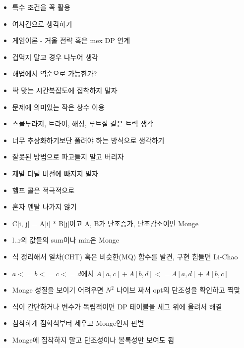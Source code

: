 \documentclass[landscape, 10pt, a4paper, oneside, twocolumn]{extarticle}
\begin{document}
\begin{itemize}
    \item 특수 조건을 꼭 활용
    \item 여사건으로 생각하기
    \item 게임이론 - 거울 전략 혹은 mex DP 연계
    \item 겁먹지 말고 경우 나누어 생각
    \item 해법에서 역순으로 가능한가?
    \item 딱 맞는 시간복잡도에 집착하지 말자
    \item 문제에 의미있는 작은 상수 이용
    \item 스몰투라지, 트라이, 해싱, 루트질 같은 트릭 생각
    \item 너무 추상화하기보단 풀려야 하는 방식으로 생각하기
    \item 잘못된 방법으로 파고들지 말고 버리자
    \item 제발 터널 비전에 빠지지 말자
    \item 헬프 콜은 적극적으로
    \item 혼자 멘탈 나가지 않기
\end{itemize}

\begin{itemize}
    \item C[i, j] = A[i] * B[j]이고 A, B가 단조증가, 단조감소이면 Monge
    \item l..r의 값들의 sum이나 min은 Monge

    \item 식 정리해서 일차(CHT) 혹은 비슷한(MQ) 함수를 발견, 구현 힘들면 Li-Chao
    \item $a <= b <= c <= d$에서 $A[a,c] + A[b,d] <= A[a,d] + A[b,c]$
    \item Monge 성질을 보이기 어려우면 $N^2$ 나이브 짜서 opt의 단조성을 확인하고 찍맞
    \item 식이 간단하거나 변수가 독립적이면 DP 테이블을 세그 위에 올려서 해결
    \item 침착하게 점화식부터 세우고 Monge인지 판별
    \item Monge에 집착하지 말고 단조성이나 볼록성만 보여도 됨
\end{itemize}
\end{document}

